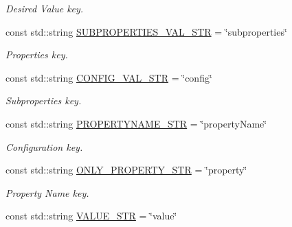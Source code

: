 \begin{DoxyCompactItemize}
\begin{DoxyCompactList}\small\item\em Desired Value key. \end{DoxyCompactList}\item 
const std\+::string \hyperlink{namespacevalStrings_af2113912107b4b3ae972b68a3566649b}{S\+U\+B\+P\+R\+O\+P\+E\+R\+T\+I\+E\+S\+\_\+\+V\+A\+L\+\_\+\+S\+TR} = \char`\"{}subproperties\char`\"{}\hypertarget{namespacevalStrings_af2113912107b4b3ae972b68a3566649b}{}\label{namespacevalStrings_af2113912107b4b3ae972b68a3566649b}

\begin{DoxyCompactList}\small\item\em Properties key. \end{DoxyCompactList}\item 
const std\+::string \hyperlink{namespacevalStrings_a1d62a932197aef59dcd1e8b392a7fc1b}{C\+O\+N\+F\+I\+G\+\_\+\+V\+A\+L\+\_\+\+S\+TR} = \char`\"{}config\char`\"{}\hypertarget{namespacevalStrings_a1d62a932197aef59dcd1e8b392a7fc1b}{}\label{namespacevalStrings_a1d62a932197aef59dcd1e8b392a7fc1b}

\begin{DoxyCompactList}\small\item\em Subproperties key. \end{DoxyCompactList}\item 
const std\+::string \hyperlink{namespacevalStrings_ab0a41360ab23ba6653aa1e3038514819}{P\+R\+O\+P\+E\+R\+T\+Y\+N\+A\+M\+E\+\_\+\+S\+TR} = \char`\"{}property\+Name\char`\"{}\hypertarget{namespacevalStrings_ab0a41360ab23ba6653aa1e3038514819}{}\label{namespacevalStrings_ab0a41360ab23ba6653aa1e3038514819}

\begin{DoxyCompactList}\small\item\em Configuration key. \end{DoxyCompactList}\item 
const std\+::string \hyperlink{namespacevalStrings_aac6403f9f0b0683336653e9c1907dfaa}{O\+N\+L\+Y\+\_\+\+P\+R\+O\+P\+E\+R\+T\+Y\+\_\+\+S\+TR} = \char`\"{}property\char`\"{}\hypertarget{namespacevalStrings_aac6403f9f0b0683336653e9c1907dfaa}{}\label{namespacevalStrings_aac6403f9f0b0683336653e9c1907dfaa}

\begin{DoxyCompactList}\small\item\em Property Name key. \end{DoxyCompactList}\item 
const std\+::string \hyperlink{namespacevalStrings_a8f3fd304ac558f50a46b0bec2e1413f6}{V\+A\+L\+U\+E\+\_\+\+S\+TR} = \char`\"{}value\char`\"{}\hypertarget{namespacevalStrings_a8f3fd304ac558f50a46b0bec2e1413f6}{}\label{namespacevalStrings_a8f3fd304ac558f50a46b0bec2e1413f6}


\end{DoxyCompactItemize}
